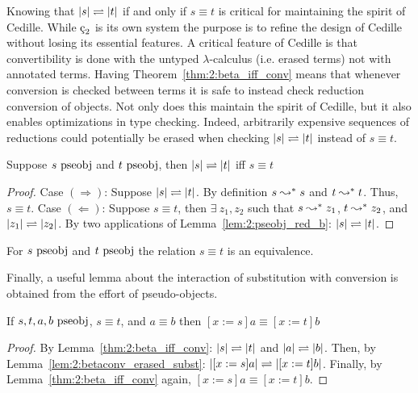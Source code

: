 Knowing that $|s| \rightleftharpoons |t|$ if and only if $s \equiv t$ is critical for maintaining the spirit of Cedille.
While $\ced$ is its own system the purpose is to refine the design of Cedille without losing its essential features.
A critical feature of Cedille is that convertibility is done with the untyped $\lambda$-calculus (i.e. erased terms) not with annotated terms.
Having Theorem~\ref{thm:2:beta_iff_conv} means that whenever conversion is checked between terms it is safe to instead check reduction conversion of objects.
Not only does this maintain the spirit of Cedille, but it also enables optimizations in type checking.
Indeed, arbitrarily expensive sequences of reductions could potentially be erased when checking $|s| \rightleftharpoons |t|$ instead of $s \equiv t$.

\begin{theorem}
    Suppose $s~\textnormal{pseobj}$ and $t~\textnormal{pseobj}$, then $|s| \rightleftharpoons |t|$ iff $s \equiv t$
    \label{thm:2:beta_iff_conv}
\end{theorem}
\begin{proof}
    Case $(\Rightarrow)$:
    Suppose $|s| \rightleftharpoons |t|$.
    By definition $s \leadsto^* s$ and $t \leadsto^* t$.
    Thus, $s \equiv t$.
    Case $(\Leftarrow)$:
    Suppose $s \equiv t$, then $\exists\ z_1, z_2$ such that $s \leadsto^* z_1$, $t \leadsto^* z_2$, and $|z_1| \rightleftharpoons |z_2|$.
    By two applications of Lemma~\ref{lem:2:pseobj_red_b}: $|s| \rightleftharpoons |t|$.
\end{proof}

\begin{corollary}
    For $s~\textnormal{pseobj}$ and $t~\textnormal{pseobj}$ the relation $s \equiv t$ is an equivalence.
\end{corollary}

Finally, a useful lemma about the interaction of substitution with conversion is obtained from the effort of pseudo-objects.

\begin{lemma}
    If $s, t, a, b~\textnormal{pseobj}$, $s \equiv t$, and $a \equiv b$ then $[x := s]a \equiv [x := t]b$
    \label{lem:2:conv_subst}
\end{lemma}
\begin{proof}
    By Lemma~\ref{thm:2:beta_iff_conv}: $|s| \rightleftharpoons |t|$ and $|a| \rightleftharpoons |b|$.
    Then, by Lemma~\ref{lem:2:betaconv_erased_subst}: $|[x := s]a| \rightleftharpoons |[x := t]b|$.
    Finally, by Lemma~\ref{thm:2:beta_iff_conv} again, $[x := s]a \equiv [x := t]b$.
\end{proof}

